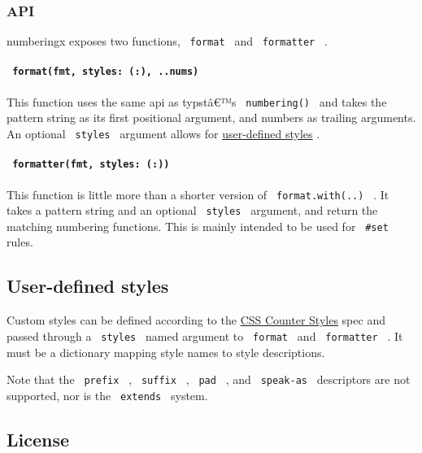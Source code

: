 \subsubsection{API}\label{api}

numberingx exposes two functions, \texttt{\ format\ } and
\texttt{\ formatter\ } .

\paragraph{\texorpdfstring{\texttt{\ format(fmt,\ styles:\ (:),\ ..nums)\ }}{ format(fmt, styles: (:), ..nums) }}\label{formatfmt-styles-..nums}

This function uses the same api as typstâ€™s \texttt{\ numbering()\ }
and takes the pattern string as its first positional argument, and
numbers as trailing arguments. An optional \texttt{\ styles\ } argument
allows for
\href{https://github.com/typst/packages/raw/main/packages/preview/numberingx/0.0.1/\#user-defined-styles}{user-defined
styles} .

\paragraph{\texorpdfstring{\texttt{\ formatter(fmt,\ styles:\ (:))\ }}{ formatter(fmt, styles: (:)) }}\label{formatterfmt-styles}

This function is little more than a shorter version of
\texttt{\ format.with(..)\ } . It takes a pattern string and an optional
\texttt{\ styles\ } argument, and return the matching numbering
functions. This is mainly intended to be used for \texttt{\ \#set\ }
rules.

\subsection{User-defined styles}\label{user-defined-styles}

Custom styles can be defined according to the
\href{https://www.w3.org/TR/css-counter-styles-3/}{CSS Counter Styles}
spec and passed through a \texttt{\ styles\ } named argument to
\texttt{\ format\ } and \texttt{\ formatter\ } . It must be a dictionary
mapping style names to style descriptions.

Note that the \texttt{\ prefix\ } , \texttt{\ suffix\ } ,
\texttt{\ pad\ } , and \texttt{\ speak-as\ } descriptors are not
supported, nor is the \texttt{\ extends\ } system.

\subsection{License}\label{license}

